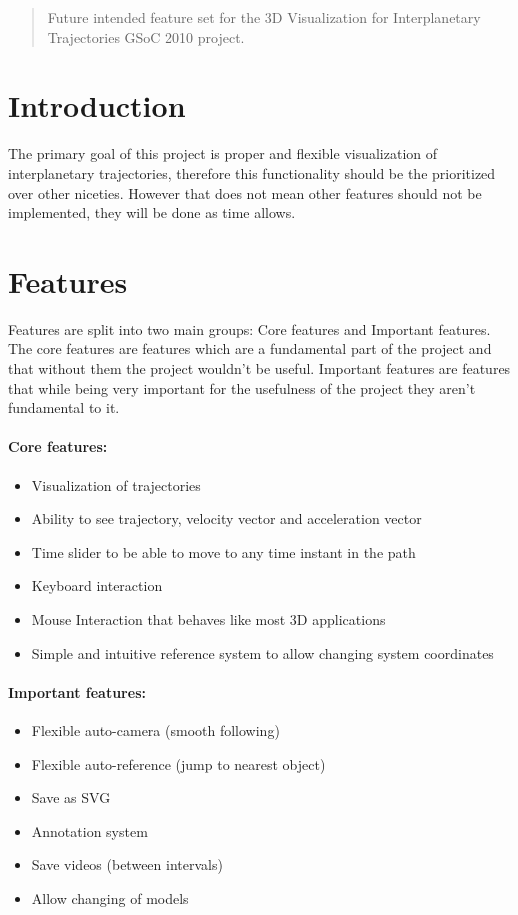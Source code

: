 \documentclass[12pt]{article}
\begin{document}
\maketitle

\begin{abstract}
Future intended feature set for the 3D Visualization for Interplanetary Trajectories GSoC 2010 project.
\end{abstract}

\section{Introduction}
The primary goal of this project is proper and flexible visualization of interplanetary trajectories, therefore this functionality should be the prioritized over other niceties. However that does not mean other features should not be implemented, they will be done as time allows.

\section{Features}

Features are split into two main groups: Core features and Important features. The core features are features which are a fundamental part of the project and that without them the project wouldn't be useful. Important features are features that while being very important for the usefulness of the project they aren't fundamental to it.

\paragraph{Core features:}
\begin{itemize}
\item Visualization of trajectories
\item Ability to see trajectory, velocity vector and acceleration vector
\item Time slider to be able to move to any time instant in the path
\item Keyboard interaction
\item Mouse Interaction that behaves like most 3D applications
\item Simple and intuitive reference system to allow changing system coordinates
\end{itemize}

\paragraph{Important features:}
\begin{itemize}
\item Flexible auto-camera (smooth following)
\item Flexible auto-reference (jump to nearest object)
\item Save as SVG
\item Annotation system
\item Save videos (between intervals)
\item Allow changing of models
\end{itemize}
\end{document}
